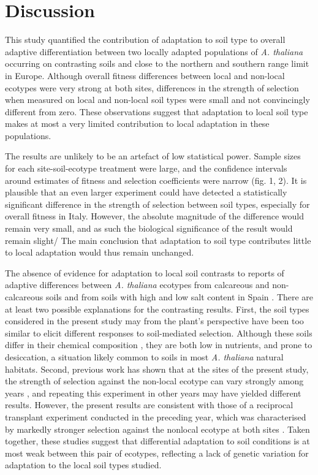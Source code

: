 \documentclass[twocolumn,twoside,lettersize]{article}
\begin{document}
\section*{Discussion}

This study quantified the contribution of adaptation to soil type to overall adaptive differentiation between two locally adapted populations of \textit{A. thaliana} occurring on contrasting soils and close to the northern and southern range limit in Europe. Although overall fitness differences between local and non-local ecotypes were very strong at both sites, differences in the strength of selection when measured on local and non-local soil types were small and not convincingly different from zero. These observations suggest that adaptation to local soil type makes at most a very limited contribution to local adaptation in these populations.

The results are unlikely to be an artefact of low statistical power. Sample sizes for each site-soil-ecotype treatment were large, and the confidence intervals around estimates of fitness and selection coefficients were narrow (fig. 1, 2). It is plausible that an even larger experiment could have detected a statistically significant difference in the strength of selection between soil types, especially for overall fitness in Italy. However, the absolute magnitude of the difference would remain very small, and as such the biological significance of the result would remain slight/ The main conclusion that adaptation to soil type contributes little to local adaptation would thus remain unchanged.

The absence of evidence for adaptation to local soil contrasts to reports of adaptive differences between \textit{A. thaliana} ecotypes from calcareous and non-calcareous soils \cite{Teres2019-nd} and from soils with high and low salt content in Spain \cite{Busoms2015-rv, Busoms2018-dg}. There are at least two possible explanations for the contrasting results. First, the soil types considered in the present study may from the plant’s perspective have been too similar to elicit different responses to soil-mediated selection. Although  these soils differ in their chemical composition \cite{Thiergart2020-rh}, they are both low in nutrients, and prone to desiccation, a situation likely common to soils in most \textit{A. thaliana} natural habitats. Second, previous work has shown that at the sites of the present study, the strength of selection against the non-local ecotype can vary strongly among years \cite{Agren2012-ga, Oakley2018-eb}, and repeating this experiment in other years may have yielded different results. However, the present results are consistent with those of a reciprocal transplant experiment conducted in the preceding year, which was characterised by markedly stronger selection against the nonlocal ecotype at both sites \cite{Thiergart2020-rh}. Taken together, these studies suggest that differential adaptation to soil conditions is at most weak between this pair of ecotypes, reflecting a lack of genetic variation for adaptation to the local soil types studied.
\end{document}
